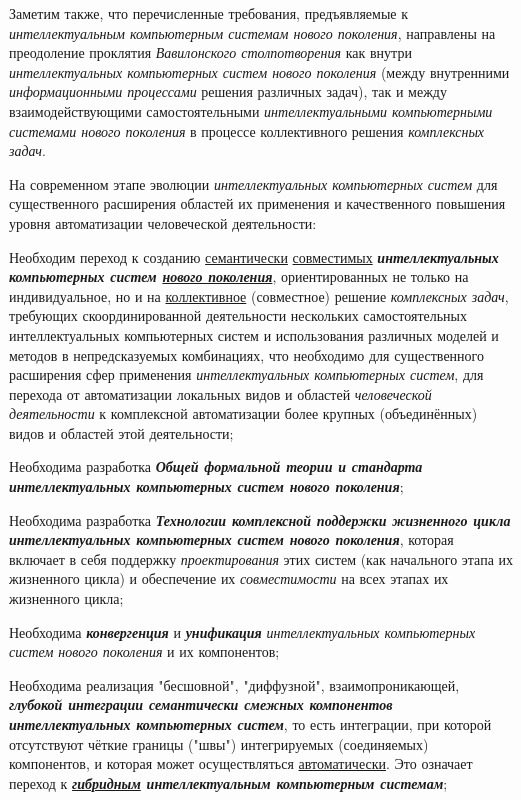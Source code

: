Заметим также, что перечисленные требования, предъявляемые к \textit{интеллектуальным компьютерным системам нового поколения}, направлены на преодоление проклятия \textit{Вавилонского столпотворения} \cite{Illiadis2019} как внутри \textit{интеллектуальных компьютерных систем нового поколения} (между внутренними \textit{информационными процессами} решения различных задач), так и между взаимодействующими самостоятельными \textit{интеллектуальными компьютерными системами нового поколения} в процессе коллективного решения \textit{комплексных задач}.

На современном этапе эволюции \textit{интеллектуальных компьютерных систем} для существенного расширения областей их применения и качественного повышения уровня автоматизации человеческой деятельности:
\begin{textitemize}
	\item
	Необходим переход к созданию \underline{семантически} \underline{совместимых} \textbf{\textit{интеллектуальных компьютерных систем \underline{нового поколения}}}, ориентированных не только на индивидуальное, но и на \underline{коллективное} (совместное) решение \textit{комплексных задач}, требующих скоординированной деятельности нескольких самостоятельных интеллектуальных компьютерных систем и использования различных моделей и методов в непредсказуемых комбинациях, что необходимо для существенного расширения сфер применения \textit{интеллектуальных компьютерных систем}, для перехода от автоматизации локальных видов и областей \textit{человеческой деятельности} к комплексной автоматизации более крупных (объединённых) видов и областей этой деятельности;
	\item
	Необходима разработка \textbf{\textit{Общей формальной теории и стандарта интеллектуальных компьютерных систем нового поколения}};
	\item
	Необходима разработка \textbf{\textit{Технологии комплексной поддержки жизненного цикла интеллектуальных компьютерных систем нового поколения}}, которая включает в себя поддержку \textit{проектирования} этих систем (как начального этапа их жизненного цикла) и обеспечение их \textit{совместимости} на всех этапах их жизненного цикла;
	\item
	Необходима \textbf{\textit{конвергенция}} и \textbf{\textit{унификация}} \textit{интеллектуальных компьютерных систем нового поколения} и их компонентов;
	\item
	Необходима реализация "бесшовной"{}, "диффузной"{}, взаимопроникающей, \textbf{\textit{глубокой интеграции семантически смежных компонентов интеллектуальных компьютерных систем}}, то есть интеграции, при которой отсутствуют чёткие границы ("швы") интегрируемых (соединяемых) компонентов, и которая может осуществляться \underline{автоматически}. Это означает переход к \textbf{\textit{\underline{гибридным} интеллектуальным компьютерным системам}};

\end{textitemize}

